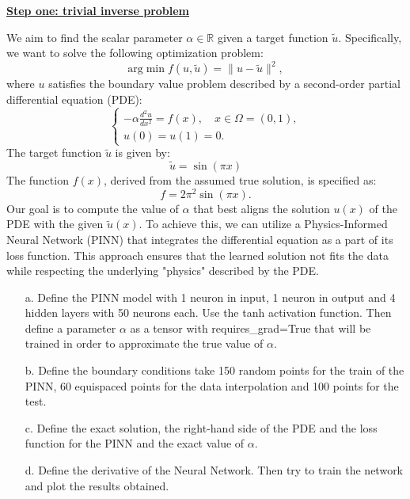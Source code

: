 \documentclass{article}
\newcommand{\step}[1]{\underline{\textbf{\large{#1}}} }
\begin{document}
\begin{center}\step{Step one: trivial inverse problem}\end{center}
We aim to find the scalar parameter $\alpha \in \mathbb{R}$ given a target function $\tilde{u}$. Specifically, we want to solve the following optimization problem:
$$
  \text{arg}\min f(u,\tilde{u}) = \| u - \tilde{u} \|^2,
$$
\noindent
where $u$ satisfies the boundary value problem described by a second-order partial differential equation (PDE):
\[
  \begin{cases}
    -\alpha \frac{d^2u}{dx^2} = f(x), \quad x \in \Omega = (0,1), \\
    u(0) = u(1) =  0.
  \end{cases}
\]
\noindent
The target function $\tilde{u}$ is given by:
$$\tilde{u} = \sin(\pi x)$$
\noindent
The function $f(x)$, derived from the assumed true solution, is specified as:
$$f = 2 \pi^2 \sin(\pi x).$$
\noindent
Our goal is to compute the value of $\alpha$ that best aligns the solution $u(x)$ of the PDE with the given $\tilde{u}(x)$.
To achieve this, we can utilize a Physics-Informed Neural Network (PINN) that integrates the differential equation as a part of its loss function.
This approach ensures that the learned solution not fits the data while respecting the underlying "physics" described by the PDE.
\begin{itemize}
  \item[a.] Define the PINN model with 1 neuron in input, 1 neuron in output and 4 hidden layers with 50 neurons each. Use the tanh activation function. Then define a parameter $\alpha$ as a tensor with requires\_grad=True that will be trained in order to approximate the true value of $\alpha$.
  \item[b.] Define the boundary conditions take 150 random points for the train of the PINN, 60 equispaced points for the data interpolation and 100 points for the test.
  \item[c.] Define the exact solution, the right-hand side of the PDE and the loss function for the PINN and the exact value of $\alpha$.
  \item[d.] Define the derivative of the Neural Network. Then try to train the network and plot the results obtained.
\end{itemize}
\end{document}
